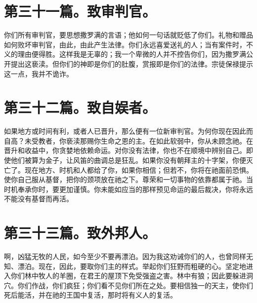 
\section{第三十一篇。致审判官。}

你们所有审判官，要思想撒罗满的言语；他如何一句话就贬低了你们。礼物和赠品如何败坏审判官，由此，由此产生法律。你们永远喜爱送礼的人；当有案件时，不义的理由便得胜。这样我是无辜的；我一个卑微的人并不控告你们，因为撒罗满公开提出这亵渎。但你们的神即是你们的肚腹，赏报即是你们的法律。宗徒保禄提示这一点，我并不诡诈。\par


\section{第三十二篇。致自娱者。}

如果地方或时间有利，或者人已晋升，那么便有一位新审判官。为何你现在因此而自高？未受教者，你亵渎那赐你生命之恩的主。在如此软弱中，你从未顾念祂。在晋升和收益中，你贪婪地依赖命运。对你没有法律，你也不在顺境中辨别自己。即使他们被算为金子，让风笛的曲调总是狂乱。如果你没有朝拜主的十字架，你便灭亡了。现在地方、时机和人都给了你，如果你相信；但若不，你将在祂面前恐惧。使你自己服从基督，把你的颈项放在祂之下。尊荣和一切事物的依靠都属于祂。当时机奉承你时，要更加谨慎。你未能如应当的那样预见命运的最后裁决，你将永远不能没有基督而再活。\par


\section{第三十三篇。致外邦人。}

啊，凶猛无牧的人民，如今至少不要再漂泊。因为我这劝诫你们的人，也曾同样无知、漂泊。现在，因此，要取你们主的样式。举起你们狂野而粗硬的心。坚定地进入你们林中牧人的羊圈，在君王的屋顶下免受强盗之害。林中有狼；因此要躲进洞穴。你们作战，你们疯狂；你们看不见你们所在之处。要相信独一的天主，使你们死后能活，并在祂的王国中复活，那时将有义人的复活。\par


